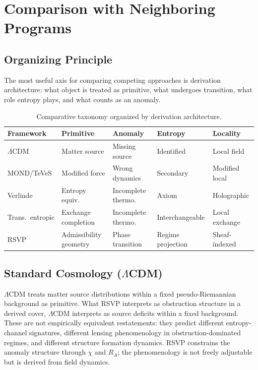 \documentclass[11pt, a4paper]{article}
\theoremstyle{plain}
\theoremstyle{definition}
\theoremstyle{remark}
\newcommand{\RA}{R_{\!A}}
\begin{document}
\section{Comparison with Neighboring Programs}
\label{sec:comparison}

\subsection{Organizing Principle}

The most useful axis for comparing competing approaches is derivation architecture:
what object is treated as primitive, what undergoes transition, what role entropy
plays, and what counts as an anomaly.

\begin{table}[ht]
\centering
\renewcommand{\arraystretch}{1.35}
\begin{tabular}{@{}p{3.2cm}p{2.8cm}p{2.8cm}p{2.5cm}p{2.5cm}@{}}
\toprule
\textbf{Framework} & \textbf{Primitive} & \textbf{Anomaly} & \textbf{Entropy} & \textbf{Locality} \\
\midrule
$\Lambda$CDM & Matter source & Missing source & Identified & Local field \\
MOND/TeVeS & Modified force & Wrong dynamics & Secondary & Modified local \\
Verlinde & Entropy equiv.\ & Incomplete thermo.\ & Axiom & Holographic \\
Trans.\ entropic & Exchange completion & Incomplete thermo.\ & Interchangeable & Local exchange \\
RSVP & Admissibility geometry & Phase transition & Regime projection & Sheaf-indexed \\
\bottomrule
\end{tabular}
\caption{Comparative taxonomy organized by derivation architecture.}
\label{tab:comparison}
\end{table}

\subsection{Standard Cosmology ($\Lambda$CDM)}

$\Lambda$CDM treats matter source distributions within a fixed pseudo-Riemannian
background as primitive. What RSVP interprets as obstruction structure in a derived
cover, $\Lambda$CDM interprets as source deficits within a fixed background. These
are not empirically equivalent restatements: they predict different entropy-channel
signatures, different lensing phenomenology in obstruction-dominated regimes, and
different structure formation dynamics. RSVP constrains the anomaly structure through
$\chi$ and $\RA$; the phenomenology is not freely adjustable but is derived from
field dynamics.
\end{document}
